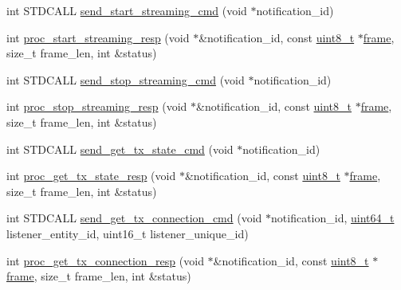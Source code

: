 \begin{DoxyCompactItemize}
\item 
int S\+T\+D\+C\+A\+LL \hyperlink{classavdecc__lib_1_1stream__output__descriptor__imp_a928dd8b641c5c6ed158ae15ad7ad3043}{send\+\_\+start\+\_\+streaming\+\_\+cmd} (void $\ast$notification\+\_\+id)
\item 
int \hyperlink{classavdecc__lib_1_1stream__output__descriptor__imp_a00065113c82302cc2e166c7a0c5f53c5}{proc\+\_\+start\+\_\+streaming\+\_\+resp} (void $\ast$\&notification\+\_\+id, const \hyperlink{stdint_8h_aba7bc1797add20fe3efdf37ced1182c5}{uint8\+\_\+t} $\ast$\hyperlink{gst__avb__playbin_8c_ac8e710e0b5e994c0545d75d69868c6f0}{frame}, size\+\_\+t frame\+\_\+len, int \&status)
\item 
int S\+T\+D\+C\+A\+LL \hyperlink{classavdecc__lib_1_1stream__output__descriptor__imp_a528a63dd6b8e71eb0cffcf5cb20936a2}{send\+\_\+stop\+\_\+streaming\+\_\+cmd} (void $\ast$notification\+\_\+id)
\item 
int \hyperlink{classavdecc__lib_1_1stream__output__descriptor__imp_a68bca93326a78c7c727b621208e3c804}{proc\+\_\+stop\+\_\+streaming\+\_\+resp} (void $\ast$\&notification\+\_\+id, const \hyperlink{stdint_8h_aba7bc1797add20fe3efdf37ced1182c5}{uint8\+\_\+t} $\ast$\hyperlink{gst__avb__playbin_8c_ac8e710e0b5e994c0545d75d69868c6f0}{frame}, size\+\_\+t frame\+\_\+len, int \&status)
\item 
int S\+T\+D\+C\+A\+LL \hyperlink{classavdecc__lib_1_1stream__output__descriptor__imp_a5d7988f4960f7edbeba8bf31ddcab62d}{send\+\_\+get\+\_\+tx\+\_\+state\+\_\+cmd} (void $\ast$notification\+\_\+id)
\item 
int \hyperlink{classavdecc__lib_1_1stream__output__descriptor__imp_ab0fb5eec111670c4c98b6682d56ec8d3}{proc\+\_\+get\+\_\+tx\+\_\+state\+\_\+resp} (void $\ast$\&notification\+\_\+id, const \hyperlink{stdint_8h_aba7bc1797add20fe3efdf37ced1182c5}{uint8\+\_\+t} $\ast$\hyperlink{gst__avb__playbin_8c_ac8e710e0b5e994c0545d75d69868c6f0}{frame}, size\+\_\+t frame\+\_\+len, int \&status)
\item 
int S\+T\+D\+C\+A\+LL \hyperlink{classavdecc__lib_1_1stream__output__descriptor__imp_a467eb83b50ba587d3ea4e1fa66e22373}{send\+\_\+get\+\_\+tx\+\_\+connection\+\_\+cmd} (void $\ast$notification\+\_\+id, \hyperlink{parse_8c_aec6fcb673ff035718c238c8c9d544c47}{uint64\+\_\+t} listener\+\_\+entity\+\_\+id, uint16\+\_\+t listener\+\_\+unique\+\_\+id)
\item 
int \hyperlink{classavdecc__lib_1_1stream__output__descriptor__imp_a0bbae515470aac2f4fdcd9089ead527c}{proc\+\_\+get\+\_\+tx\+\_\+connection\+\_\+resp} (void $\ast$\&notification\+\_\+id, const \hyperlink{stdint_8h_aba7bc1797add20fe3efdf37ced1182c5}{uint8\+\_\+t} $\ast$\hyperlink{gst__avb__playbin_8c_ac8e710e0b5e994c0545d75d69868c6f0}{frame}, size\+\_\+t frame\+\_\+len, int \&status)

\end{DoxyCompactItemize}
